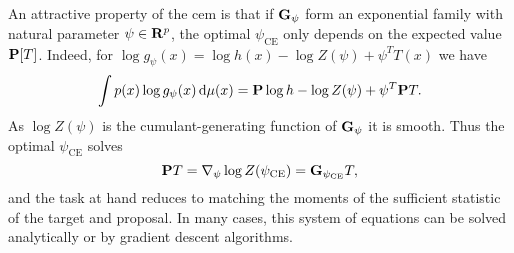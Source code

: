 %
%
%
%
%
%    

An attractive property of the \gls{cem} is that if $\G_{\psi}$ form an exponential family with natural parameter $\psi \in \R^{p}$, the optimal $\psi_{\text{CE}}$ only depends on the expected value $\P [T]$. Indeed, for $\log g_{\psi}(x) = \log h(x) - \log Z(\psi) + \psi^{T} T(x)$ we have 
$$
\int p(x) \log g_{\psi}(x) \d \mu(x) = \P \log h - \log Z(\psi) + \psi^{T} \P T.
$$
As $\log Z(\psi)$ is the cumulant-generating function of $\G_{\psi}$ it is smooth. Thus the optimal $\psi_{\text{CE}}$ solves
$$
\P T = \nabla_{\psi} \log Z(\pce) = \G_{\pce}T,
$$
and the task at hand reduces to matching the moments of the sufficient statistic of the target and proposal.
In many cases, this system of equations can be solved analytically or by gradient descent algorithms.

